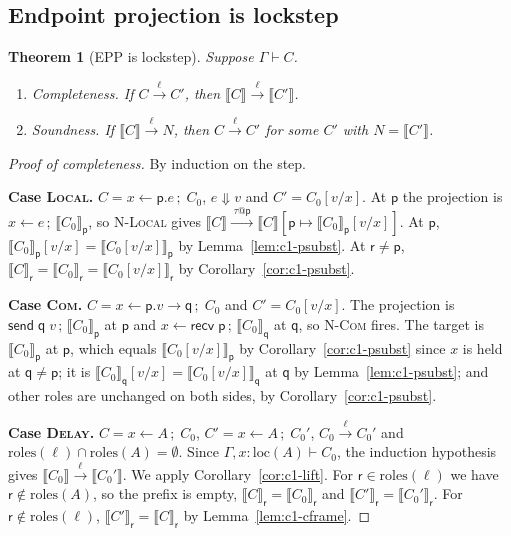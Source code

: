 \documentclass[11pt]{report}
\makeatletter
\theoremstyle{plain}
\newtheorem{theorem}{Theorem}[chapter]
\theoremstyle{definition}
\theoremstyle{remark}
\newcommand{\kw}[1]{\mathsf{#1}}
\newcommand{\pp}{\mathsf{p}}
\newcommand{\qq}{\mathsf{q}}
\newcommand{\rr}{\mathsf{r}}
\newcommand{\bind}[3]{#1 \leftarrow #2\,;\;#3}
\newcommand{\com}[3]{#1.#2 \to #3}
\newcommand{\roles}[1]{\mathrm{roles}(#1)}
\newcommand{\loc}[1]{\mathrm{loc}(#1)}
\newcommand{\tauat}[1]{\tau\mathord{@}#1}
\newcommand{\lto}[1]{\xrightarrow{\;#1\;}}
\newcommand{\nsend}[2]{\kw{send}\;#1\;#2}
\newcommand{\nrecv}[1]{\kw{recv}\;#1}
\newcommand{\upd}[3]{#1[#2 \mapsto #3]}
\newcommand{\proj}[2]{\llbracket #1 \rrbracket_{#2}}
\newcommand{\projn}[1]{\llbracket #1 \rrbracket}
\newcommand{\rn}[1]{{\normalfont\scshape #1}}
\newcommand{\case}[1]{\medskip\noindent\textbf{Case #1.}\;}
\makeatother
\begin{document}
\subsection{Endpoint projection is lockstep}

\begin{theorem}[EPP is lockstep]\label{thm:c1-epp}
  Suppose $\Gamma\vdash C$.
  \begin{enumerate}[label=(\arabic*),nosep]
  \item\label{it:c1-complete} \emph{Completeness.} If $C\lto{\ell}C'$, then $\projn{C}\lto{\ell}\projn{C'}$.
  \item\label{it:c1-sound} \emph{Soundness.} If $\projn{C}\lto{\ell}N$, then
    $C\lto{\ell}C'$ for some $C'$ with $N=\projn{C'}$.
  \end{enumerate}
\end{theorem}

\begin{proof}[Proof of completeness]
  By induction on the step.

  \case{\rn{Local}}
  $C=\bind{x}{\pp.e}{C_0}$, $e\Downarrow v$ and $C'=C_0[v/x]$.  At $\pp$ the
  projection is $x\leftarrow e\,;\,\proj{C_0}{\pp}$, so \rn{N-Local} gives
  $\projn{C}\lto{\tauat\pp}\upd{\projn{C}}{\pp}{\proj{C_0}{\pp}[v/x]}$.  At
  $\pp$, $\proj{C_0}{\pp}[v/x]=\proj{C_0[v/x]}{\pp}$ by
  Lemma~\ref{lem:c1-psubst}.  At $\rr\neq\pp$,
  $\proj{C}{\rr}=\proj{C_0}{\rr}=\proj{C_0[v/x]}{\rr}$ by
  Corollary~\ref{cor:c1-psubst}.

  \case{\rn{Com}}
  $C=\bind{x}{\com{\pp}{v}{\qq}}{C_0}$ and $C'=C_0[v/x]$.  The projection is
  $\nsend{\qq}{v}\,;\,\proj{C_0}{\pp}$ at $\pp$ and
  $x\leftarrow\nrecv{\pp}\,;\,\proj{C_0}{\qq}$ at $\qq$, so \rn{N-Com} fires.
  The target is $\proj{C_0}{\pp}$ at $\pp$, which equals
  $\proj{C_0[v/x]}{\pp}$ by Corollary~\ref{cor:c1-psubst} since $x$ is held
  at $\qq\neq\pp$; it is $\proj{C_0}{\qq}[v/x]=\proj{C_0[v/x]}{\qq}$ at $\qq$
  by Lemma~\ref{lem:c1-psubst}; and other roles are unchanged on both sides,
  by Corollary~\ref{cor:c1-psubst}.

  \case{\rn{Delay}}
  $C=\bind{x}{A}{C_0}$, $C'=\bind{x}{A}{C_0'}$, $C_0\lto{\ell}C_0'$ and
  $\roles{\ell}\cap\roles{A}=\emptyset$.  Since $\Gamma,x{:}\loc{A}\vdash C_0$,
  the induction hypothesis gives $\projn{C_0}\lto{\ell}\projn{C_0'}$.  We
  apply Corollary~\ref{cor:c1-lift}.  For $\rr\in\roles{\ell}$ we have
  $\rr\notin\roles{A}$, so the prefix is empty, $\proj{C}{\rr}=\proj{C_0}{\rr}$
  and $\proj{C'}{\rr}=\proj{C_0'}{\rr}$.  For $\rr\notin\roles{\ell}$,
  $\proj{C'}{\rr}=\proj{C}{\rr}$ by Lemma~\ref{lem:c1-cframe}.
\end{proof}
\end{document}
